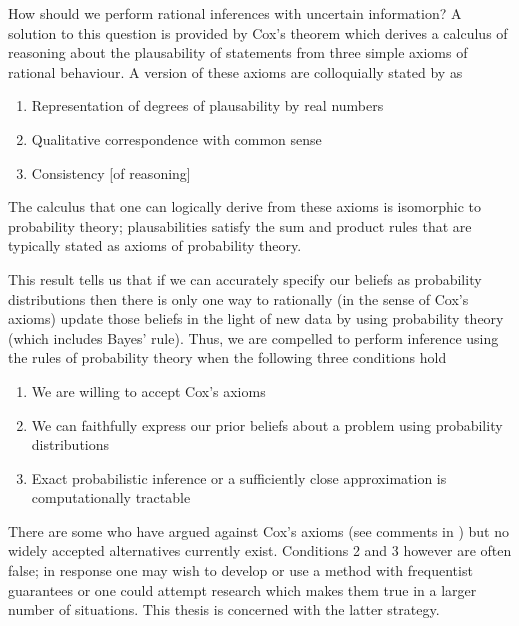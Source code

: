 How should we perform rational inferences with uncertain information?
A solution to this question is provided by Cox's theorem \citep{Cox1946-qc} which derives a calculus of reasoning about the plausability of statements from three simple axioms of rational behaviour.
A version of these axioms are colloquially stated by \citet{Jaynes2003-jh} as
\begin{enumerate}
  \item Representation of degrees of plausability by real numbers
  \item Qualitative correspondence with common sense
  \item Consistency [of reasoning]
\end{enumerate}
The calculus that one can logically derive from these axioms is isomorphic to probability theory; plausabilities satisfy the sum and product rules that are typically stated as axioms of probability theory.

This result tells us that if we can accurately specify our beliefs as probability distributions then there is only one way to rationally (in the sense of Cox's axioms) update those beliefs in the light of new data \ie by using probability theory (which includes Bayes' rule).
Thus, we are compelled to perform inference using the rules of probability theory when the following three conditions hold
\begin{enumerate}
  \item We are willing to accept Cox's axioms
  \item We can faithfully express our prior beliefs about a problem using probability distributions
  \item Exact probabilistic inference or a sufficiently close approximation is computationally tractable
\end{enumerate}
There are some who have argued against Cox's axioms (see comments in \citet{Jaynes2003-jh}) but no widely accepted alternatives currently exist.
Conditions 2 and 3 however are often false; in response one may wish to develop or use a method with frequentist guarantees or one could attempt research which makes them true in a larger number of situations\footnotemark{}.
This thesis is concerned with the latter strategy.


